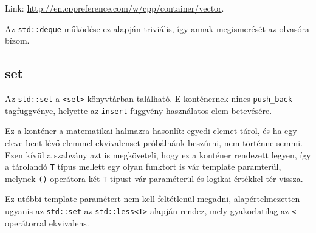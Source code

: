 \documentclass[a4paper,11.5pt,table]{article}
\begin{document}
	\medskip
	Link: \url{http://en.cppreference.com/w/cpp/container/vector}.
	
	\begin{note}
		Az \texttt{std::deque} működése ez alapján triviális, így annak megismerését az olvasóra bízom.
	\end{note}
	\subsection{set}
	
	Az \texttt{std::set} a \texttt{<set>} könyvtárban található. E konténernek nincs \texttt{push\_back} tagfüggvénye, helyette az \texttt{insert} függvény használatos elem betevésére. 
	\medskip
	
	Ez a konténer a matematikai halmazra hasonlít: egyedi elemet tárol, és ha egy eleve bent lévő elemmel ekvivalenset próbálnánk beszúrni, nem történne semmi. Ezen kívül a szabvány azt is megköveteli, hogy ez a konténer rendezett legyen, így a tárolandó \texttt{T} típus mellett egy olyan funktort is vár template paramterül, melynek \texttt{()} operátora két \texttt{T} típust vár paraméterül és logikai értékkel tér vissza.
	\smallskip
	
	Ez utóbbi template paramétert nem kell feltétlenül megadni, alapértelmezetten ugyanis az \texttt{std::set} az \texttt{std::less<T>} alapján rendez, mely gyakorlatilag az \texttt{<} operátorral ekvivalens.
	\smallskip
	
\end{document}
